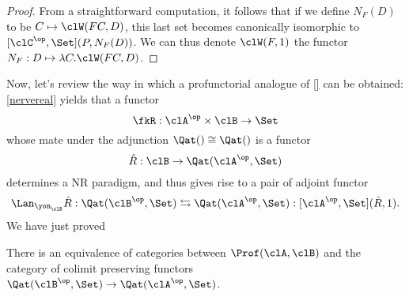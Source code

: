 \documentclass[a4paper]{../birkjour}
\begin{document}
\begin{proof}
	From a straightforward computation, it follows that if we define $N_F(D)$ to be $C\mapsto \clW(F C,D)$, this last set becomes canonically isomorphic to $[\clC^\op,\Set](P,N_F(D))$. We can thus denote $\clW(F,1)$ the functor $N_F : D\mapsto \lambda C.\clW(F C,D)$.
\end{proof}
Now, let's review the way in which a profunctorial analogue of \ref{} can be obtained: \autoref{nervereal} yields that a functor 
\[ \fkR : \clA^\op\times \clB \to \Set \]
whose mate under the adjunction $\Qat()\cong\Qat()$ is a functor 
\[ \hat R : \clB \to \Qat(\clA^\op,\Set) \]
determines a NR paradigm, and thus gives rise to a pair of adjoint functor 
\[ \Lan_{\yon_\clB} \hat R : \Qat(\clB^\op,\Set) \leftrightarrows \Qat(\clA^\op,\Set) : [\clA^\op,\Set](\hat R,1). \]
We have just proved 
\begin{proposition}
  There is an equivalence of categories between $\Prof(\clA,\clB)$ and the category of colimit preserving functors $\Qat(\clB^\op,\Set) \to \Qat(\clA^\op,\Set)$.
\end{proposition}
\end{document}
